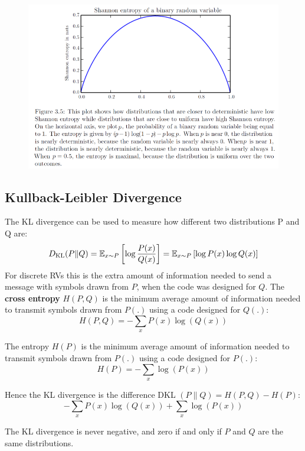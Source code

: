 \begin{multicols}{2}
	\begin{figure}[H]
		\centering
		\includegraphics[width=1\linewidth]{images/shannon.png}
	\end{figure}

	\subsection{Kullback-Leibler Divergence}
	The KL divergence can be used to measure how different two distributions P and Q are:
	\[ D_{\text{KL}}(P\lVert Q) = \mathbb{E}_{x\sim P}\left[\log \frac{P(x)}{Q(x)}\right]=
	\mathbb{E}_{x\sim P}\left[\log {P(x)} \log {Q(x)}\right]
	 \]
	For discrete RVs this is the extra amount of information needed to send a message with symbols drawn from $P$, when the code was designed for $Q$.
	The \textbf{cross entropy} $H(P,Q)$ is the minimum average amount of information needed to transmit symbols drawn from $P(.)$ using a code designed for $Q(.)$:
	\[ H(P,Q) = -\sum_{x} P(x)\log \left(Q(x)\right) \]

	The entropy $H(P)$ is the minimum average amount of information needed to transmit symbols drawn from $P(.)$ using a code designed for $P(.)$:
	\[ H(P) = -\sum_{x} \log\left(P(x)\right) \]

	Hence the KL divergence is the difference DKL $(P\lVert Q)=H(P,Q)-H(P)$:
	\[ -\sum_{x} P(x)\log \left(Q(x)\right) +\sum_{x} \log\left(P(x)\right) \]

	The KL divergence is never negative, and zero if and only if $P$ and $Q$ are the same distributions.

\end{multicols}
\newpage
